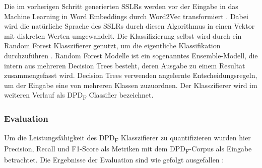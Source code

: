 \documentclass[conference]{IEEEtran}
\begin{document}
Die im vorherigen Schritt generierten SSLRs werden vor der Eingabe in das Machine Learning in Word Embeddings durch Word2Vec transformiert \cite[p. 6]{NAZAR2022111179}. Dabei wird die natürliche Sprache des SSLRs durch diesen Algorithmus in einen Vektor mit diskreten Werten umgewandelt.
Die Klassifizierung selbst wird durch ein Random Forest Klasszifierer genutzt, um die eigentliche Klassifikation durchzuführen \cite[p. 7]{NAZAR2022111179}. Random Forest Modelle ist ein sogenanntes Ensemble-Modell, die intern aus mehreren Decision Trees besteht, deren Ausgabe zu einem Resultat zusammengefasst wird. Decision Trees verwenden angelernte Entscheidungsregeln, um der Eingabe eine von mehreren Klassen zuzuordnen.
Der Klasszifierer wird im weiteren Verlauf als DPD\textsubscript{F} Classifier bezeichnet.

\subsubsection*{Evaluation}

Um die Leistungsfähigkeit des DPD\textsubscript{F} Klasszifierer zu quantifizieren wurden hier Precision, Recall und F1-Score als Metriken mit dem DPD\textsubscript{F}-Corpus als Eingabe betrachtet.
Die Ergebnisse der Evaluation sind wie gefolgt ausgefallen  \cite[p. 8]{NAZAR2022111179}:
\end{document}
